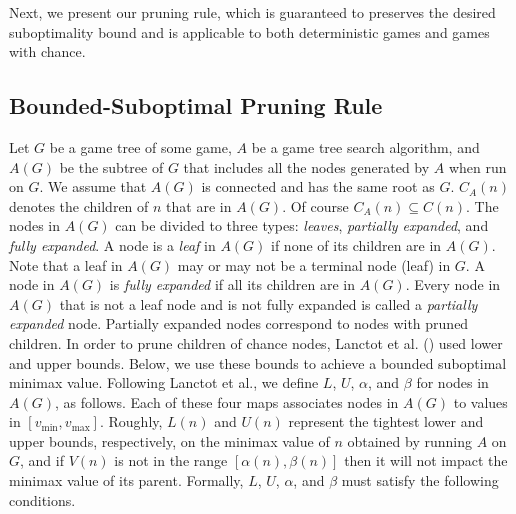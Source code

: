 \documentclass[letterpaper]{article} %
\newcommand{\MM}{\mathit{V}}
\newcommand{\pess}{\mathit{L}}
\newcommand{\opti}{\mathit{U}}
\newcommand{\vmax}{v_{\text{max}}}
\newcommand{\vmin}{v_{\text{min}}}
\begin{document}

Next, we present our pruning rule, which is guaranteed to preserves the desired suboptimality bound and is applicable to both deterministic games and games with chance. 

\subsection{Bounded-Suboptimal Pruning Rule}
Let $G$ be a game tree of some game, $A$ be a game tree search algorithm, and $A(G)$ be the subtree of $G$ that includes all the nodes generated by $A$ when run on $G$.
We assume that $A(G)$ is connected and has the same root as $G$. 
$C_A(n)$ denotes the children of $n$ that are in $A(G)$. Of course $C_A(n)\subseteq C(n)$.  
The nodes in $A(G)$ can be divided to three types: \emph{leaves}, \emph{partially expanded}, and \emph{fully expanded}.
A node is a \emph{leaf} in $A(G)$ if none of its children are in $A(G)$.
Note that a leaf in $A(G)$ may or may not be a terminal node (leaf) in $G$.  
A node in $A(G)$ is \emph{fully expanded} if all its children are in $A(G)$.
Every node in $A(G)$ that is not a leaf node and is not fully expanded is called a \emph{partially expanded} node. 
Partially expanded nodes correspond to nodes with pruned children.
In order to prune children of chance nodes, Lanctot et al. (\citeyear{lanctot2013monte}) used lower and upper bounds. Below, we use these bounds to achieve a bounded suboptimal minimax value.
Following Lanctot et al., we define $\pess$, $\opti$, $\alpha$, and $\beta$ for nodes in $A(G)$, as follows. 
Each of these four maps associates nodes in $A(G)$ to values in $[\vmin, \vmax]$. Roughly, $\pess(n)$ and $\opti(n)$ represent the tightest lower and upper bounds, respectively, on the minimax value of $n$  obtained by running $A$ on $G$, and if $\MM(n)$ is not in the range $[\alpha(n),\beta(n)]$ then it will not impact the minimax value of its parent. Formally, $\pess$, $\opti$, $\alpha$, and $\beta$ must satisfy the following conditions. 
\end{document}
